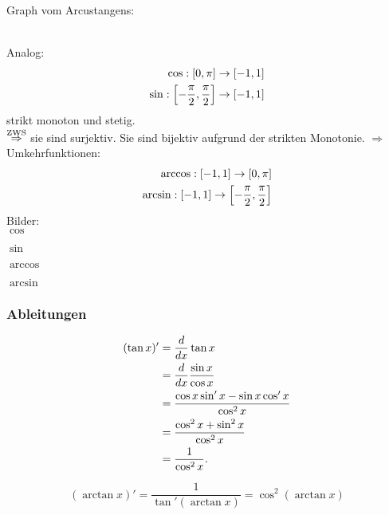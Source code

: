 \documentclass[../ana2.tex]{subfiles}
\begin{document}
Graph vom Arcustangens:\\
\begin{tikzpicture}
    
\end{tikzpicture}\\
Analog: 
\begin{align*}
    \abb{\cos}{[0,\pi]}{[-1,1]} \\
    \abb{\sin}{\left[-\frac{\pi}{2}, \frac{\pi}{2}\right]}{[-1,1]}
\end{align*}
strikt monoton und stetig.\\
\( \oversett{ZWS}{\Rightarrow} \) sie sind surjektiv.
Sie sind bijektiv aufgrund der strikten Monotonie.
\( \Rightarrow \) Umkehrfunktionen:
\begin{align*}
    \abb{\arccos}{[-1,1]}{[0,\pi]} \\
    \abb{\arcsin}{[-1,1]}{\left[-\frac{\pi}{2},\frac{\pi}{2}\right]}
\end{align*}
Bilder:\\
\( \cos \)
\begin{tikzpicture}
    
\end{tikzpicture}
\( \sin \)
\begin{tikzpicture}
    
\end{tikzpicture}
\( \arccos \)
\begin{tikzpicture}
    
\end{tikzpicture}
\( \arcsin \)
\begin{tikzpicture}
    
\end{tikzpicture}

\subsubsection*{Ableitungen}
\begin{align*}
    (\tan x)' &= \ddx \tan x \\
    &= \ddx \frac{\sin x}{\cos x}\\
    &= \frac{\cos x \sin'x - \sin x \cos'x}{\cos^2 x}\\
    &= \frac{\cos^2 x + \sin^2 x}{\cos^2 x} \\
    &= \frac{1}{\cos^2 x}.
\end{align*}

\[ (\arctan x)' = \frac{1}{\tan'(\arctan x)} 
= \cos^2(\arctan x) \]
\end{document}
